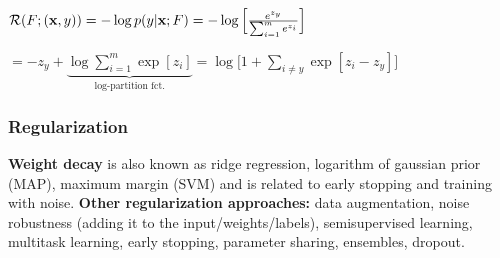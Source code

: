     $\mathcal{R}(F;(\mathbf x,y)) = -\log p(y|\mathbf x;F)=-\log\Big[\frac{e^{z_y}}{\sum_{i=1}^me^{z_i}}\Big]$ 
    
    $= -z_y + \underbrace{\log\sum\limits_{i=1}^m \exp[z_i]}_{\text{log-partition fct.}} =\log\Bigg[1+\sum\limits_{i\neq y}\exp[z_i-z_y]\Bigg]$
    
    \subsubsection{Regularization}
    \textbf{Weight decay} is also known as ridge regression, logarithm of gaussian prior (MAP), maximum margin (SVM) and is related to early stopping and training with noise.
    \textbf{Other regularization approaches:} data augmentation, noise robustness (adding it to the input/weights/labels), semisupervised learning, multitask learning, early stopping, parameter sharing, ensembles, dropout.
    